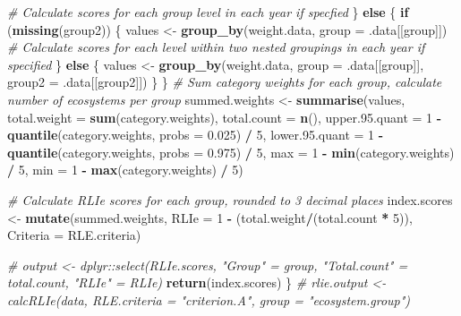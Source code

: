 \documentclass[]{article}
\newenvironment{Shaded}{\begin{snugshade}}{\end{snugshade}}
\newcommand{\KeywordTok}[1]{\textcolor[rgb]{0.13,0.29,0.53}{\textbf{#1}}}
\newcommand{\DataTypeTok}[1]{\textcolor[rgb]{0.13,0.29,0.53}{#1}}
\newcommand{\DecValTok}[1]{\textcolor[rgb]{0.00,0.00,0.81}{#1}}
\newcommand{\FloatTok}[1]{\textcolor[rgb]{0.00,0.00,0.81}{#1}}
\newcommand{\StringTok}[1]{\textcolor[rgb]{0.31,0.60,0.02}{#1}}
\newcommand{\CommentTok}[1]{\textcolor[rgb]{0.56,0.35,0.01}{\textit{#1}}}
\newcommand{\ControlFlowTok}[1]{\textcolor[rgb]{0.13,0.29,0.53}{\textbf{#1}}}
\newcommand{\OperatorTok}[1]{\textcolor[rgb]{0.81,0.36,0.00}{\textbf{#1}}}
\newcommand{\NormalTok}[1]{#1}
\begin{document}
\begin{Shaded}
\begin{Highlighting}[]
    \CommentTok{# Calculate scores for each group level in each year if specfied}
\NormalTok{  \} }\ControlFlowTok{else}\NormalTok{ \{}
    \ControlFlowTok{if}\NormalTok{ (}\KeywordTok{missing}\NormalTok{(group2)) \{}
\NormalTok{      values <-}\StringTok{ }\KeywordTok{group_by}\NormalTok{(weight.data, }\DataTypeTok{group =}\NormalTok{ .data[[group]])}
      \CommentTok{# Calculate scores for each level within two nested groupings in each year if specified}
\NormalTok{    \}  }\ControlFlowTok{else}\NormalTok{ \{}
\NormalTok{      values <-}\StringTok{ }\KeywordTok{group_by}\NormalTok{(weight.data, }\DataTypeTok{group =}\NormalTok{ .data[[group]],}
                         \DataTypeTok{group2 =}\NormalTok{ .data[[group2]])}
\NormalTok{    \}}
\NormalTok{  \}}
  \CommentTok{# Sum category weights for each group, calculate number of ecosystems per group}
\NormalTok{  summed.weights <-}\StringTok{ }\KeywordTok{summarise}\NormalTok{(values, }\DataTypeTok{total.weight =} \KeywordTok{sum}\NormalTok{(category.weights), }\DataTypeTok{total.count =} \KeywordTok{n}\NormalTok{(), }
                              \DataTypeTok{upper.95.quant =} \DecValTok{1} \OperatorTok{-}\StringTok{ }\KeywordTok{quantile}\NormalTok{(category.weights, }\DataTypeTok{probs =} \FloatTok{0.025}\NormalTok{) }\OperatorTok{/}\StringTok{ }\DecValTok{5}\NormalTok{, }
                              \DataTypeTok{lower.95.quant =} \DecValTok{1} \OperatorTok{-}\StringTok{ }\KeywordTok{quantile}\NormalTok{(category.weights, }\DataTypeTok{probs =} \FloatTok{0.975}\NormalTok{) }\OperatorTok{/}\StringTok{ }\DecValTok{5}\NormalTok{,}
                              \DataTypeTok{max =} \DecValTok{1} \OperatorTok{-}\StringTok{ }\KeywordTok{min}\NormalTok{(category.weights) }\OperatorTok{/}\StringTok{ }\DecValTok{5}\NormalTok{,}
                              \DataTypeTok{min =} \DecValTok{1} \OperatorTok{-}\StringTok{ }\KeywordTok{max}\NormalTok{(category.weights) }\OperatorTok{/}\StringTok{ }\DecValTok{5}\NormalTok{)}
  
  \CommentTok{# Calculate RLIe scores for each group, rounded to 3 decimal places}
\NormalTok{  index.scores <-}\StringTok{ }\KeywordTok{mutate}\NormalTok{(summed.weights, }\DataTypeTok{RLIe =} \DecValTok{1} \OperatorTok{-}\StringTok{ }\NormalTok{(total.weight}\OperatorTok{/}\NormalTok{(total.count }\OperatorTok{*}\StringTok{ }\DecValTok{5}\NormalTok{)),}
                         \DataTypeTok{Criteria =}\NormalTok{ RLE.criteria)}
  
  \CommentTok{# output <- dplyr::select(RLIe.scores, "Group" = group, "Total.count" = total.count, "RLIe" = RLIe)}
  \KeywordTok{return}\NormalTok{(index.scores)}
\NormalTok{\}}
\CommentTok{# rlie.output <- calcRLIe(data, RLE.criteria = "criterion.A", group = "ecosystem.group")}
\end{Highlighting}
\end{Shaded}
\end{document}

